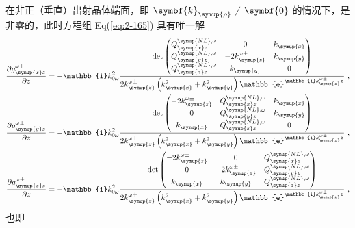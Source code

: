 在非正（垂直）出射晶体端面，即 $\symbf{k}_{\symup{\rho}} \neq \symbf{0}$ 的情况下，是非零的，此时方程组 Eq(\ref{eq:2-165}) 具有唯一解
\begin{subequations} \label{eq:2-167}
	\abovedisplayskip=10pt
	\belowdisplayskip=10pt
	\begin{align}
		\displaystyle{\frac{\partial g^{\omega\pm}_{\symup{x} z}}{\partial z}} &= - \mathbb{i} k^{2}_{0\omega} \frac{ \det \begin{pmatrix} Q^{{\symup{NL}},\omega}_{\symup{x} z} & 0 & k_{\symup{x}} \\ Q^{{\symup{NL}},\omega}_{\symup{y} z} & - 2 k^{\omega\pm}_{\symup{z}} & k_{\symup{y}} \\ Q^{{\symup{NL}},\omega}_{\symup{z} z} & k_{\symup{y}} & 0 \end{pmatrix} }{ 2 k^{\omega\pm}_{\symup{z}} \left( k^2_{\symup{x}} + k^2_{\symup{y}} \right) \mathbb{e}^{\mathbb{i} k^{\omega\pm}_{\symup{z}} z}} \label{eq:2-167a}~, \\ \displaystyle{\frac{\partial g^{\omega\pm}_{\symup{y} z}}{\partial z}} &= - \mathbb{i} k^{2}_{0\omega} \frac{ \det \begin{pmatrix} - 2 k^{\omega\pm}_{\symup{z}} & Q^{{\symup{NL}},\omega}_{\symup{x} z} & k_{\symup{x}} \\ 0 & Q^{{\symup{NL}},\omega}_{\symup{y} z} & k_{\symup{y}} \\ k_{\symup{x}} & Q^{{\symup{NL}},\omega}_{\symup{z} z} & 0 \end{pmatrix} }{ 2 k^{\omega\pm}_{\symup{z}} \left( k^2_{\symup{x}} + k^2_{\symup{y}} \right) \mathbb{e}^{\mathbb{i} k^{\omega\pm}_{\symup{z}} z}} \label{eq:2-167b}~, \\ \displaystyle{\frac{\partial g^{\omega\pm}_{\symup{z} z}}{\partial z}} &= - \mathbb{i} k^{2}_{0\omega} \frac{ \det \begin{pmatrix} - 2 k^{\omega\pm}_{\symup{z}} & 0 & Q^{{\symup{NL}},\omega}_{\symup{x} z} \\ 0 & - 2 k^{\omega\pm}_{\symup{z}} & Q^{{\symup{NL}},\omega}_{\symup{y} z} \\ k_{\symup{x}} & k_{\symup{y}} & Q^{{\symup{NL}},\omega}_{\symup{z} z} \end{pmatrix} }{ 2 k^{\omega\pm}_{\symup{z}} \left( k^2_{\symup{x}} + k^2_{\symup{y}} \right) \mathbb{e}^{\mathbb{i} k^{\omega\pm}_{\symup{z}} z}} \label{eq:2-167c}~,
	\end{align}
\end{subequations}
也即
